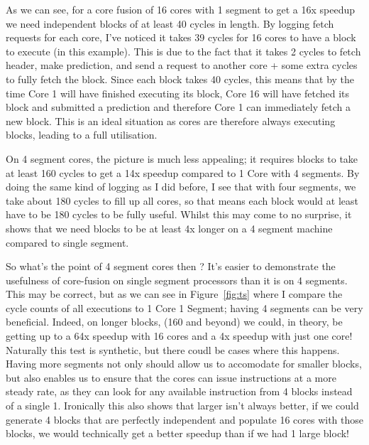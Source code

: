As we can see, for a core fusion of 16 cores with 1 segment to get a 16x speedup we need independent blocks of at least 40 cycles in length.
By logging fetch requests for each core, I've noticed it takes 39 cycles for 16 cores to have a block to execute (in this example).
This is due to the fact that it takes 2 cycles to fetch header, make prediction, and send a request to another core + some extra cycles to fully fetch the block.
Since each block takes 40 cycles, this means that by the time Core 1 will have finished executing its block, Core 16 will have fetched its block and submitted a prediction and therefore Core 1 can immediately fetch a new block.
This is an ideal situation as cores are therefore always executing blocks, leading to a full utilisation.

On 4 segment cores, the picture is much less appealing; it requires blocks to take at least 160 cycles to get a 14x speedup compared to 1 Core with 4 segments.
By doing the same kind of logging as I did before, I see that with four segments, we take about 180 cycles to fill up all cores, so that means each block would at least have to be 180 cycles to be fully useful. 
Whilst this may come to no surprise, it shows that we need blocks to be at least 4x longer on a 4 segment machine compared to single segment.

So what's the point of 4 segment cores then ? It's easier to demonstrate the usefulness of core-fusion on single segment processors than it is on 4 segments.
This may be correct, but as we can see in Figure~\ref{fig:ts} where I compare the cycle counts of all executions to 1 Core 1 Segment; having 4 segments can be very beneficial.
Indeed, on longer blocks, (160 and beyond) we could, in theory, be getting up to a 64x speedup with 16 cores and a 4x speedup with just one core!
Naturally this test is synthetic, but there coudl be cases where this happens.
Having more segments not only should allow us to accomodate for smaller blocks, but also enables us to ensure that the cores can issue instructions at a more steady rate, as they can look for any available instruction from 4 blocks instead of a single 1.
Ironically this also shows that larger isn't always better, if we could generate 4 blocks that are perfectly independent and populate 16 cores with those blocks, we would technically get a better speedup than if we had 1 large block!


